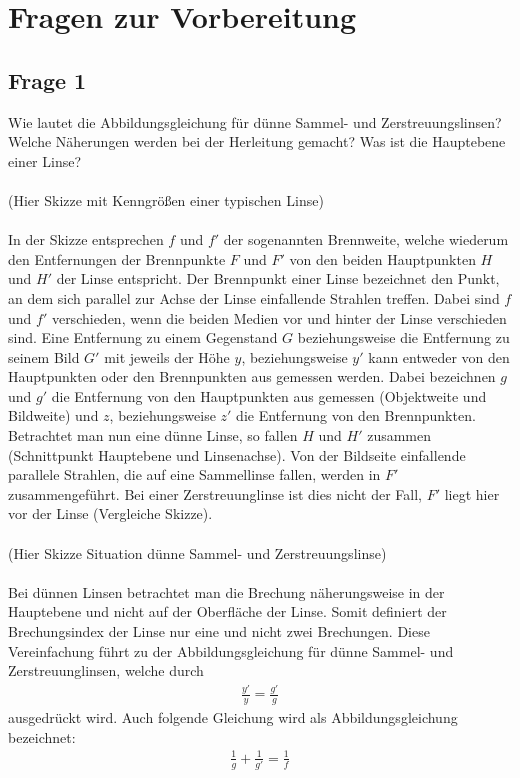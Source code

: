 \documentclass[a4paper,10pt]{scrartcl}
\begin{document}
		\newpage
		
	\section{Fragen zur Vorbereitung}
		\subsection{Frage 1}
			Wie lautet die Abbildungsgleichung für dünne Sammel- und Zerstreuungslinsen? Welche Näherungen
			werden bei der Herleitung gemacht? Was ist die Hauptebene einer Linse?\\
			\\
			(Hier Skizze mit Kenngrößen einer typischen Linse)\\
			\\
			In der Skizze entsprechen \(f\) und \(f'\) der sogenannten Brennweite, welche wiederum den Entfernungen der Brennpunkte \(F\) und \(F'\) von den beiden Hauptpunkten \(H\) und \(H'\) der Linse entspricht. Der Brennpunkt einer Linse bezeichnet den Punkt, an dem sich parallel zur Achse der Linse einfallende Strahlen treffen. Dabei sind \(f\) und \(f'\) verschieden, wenn die beiden Medien vor und hinter der Linse verschieden sind. Eine Entfernung zu einem Gegenstand \(G\) beziehungsweise die Entfernung zu seinem Bild \(G'\) mit jeweils der Höhe \(y\), beziehungsweise \(y'\) kann entweder von den Hauptpunkten oder den Brennpunkten aus gemessen werden. Dabei bezeichnen \(g\) und \(g'\) die Entfernung von den Hauptpunkten aus gemessen (Objektweite und Bildweite) und \(z\), beziehungsweise \(z'\) die Entfernung von den Brennpunkten. Betrachtet man nun eine dünne Linse, so fallen \(H\) und \(H'\) zusammen (Schnittpunkt Hauptebene und Linsenachse). Von der Bildseite einfallende parallele Strahlen, die auf eine Sammellinse fallen, werden in \(F'\) zusammengeführt. Bei einer Zerstreuunglinse ist dies nicht der Fall, \(F'\) liegt hier vor der Linse (Vergleiche Skizze).\\
			\\
			(Hier Skizze Situation dünne Sammel- und Zerstreuungslinse)\\
			\\
			Bei dünnen Linsen betrachtet man die Brechung näherungsweise in der Hauptebene und nicht auf der Oberfläche der Linse. Somit definiert der Brechungsindex der Linse nur eine und nicht zwei Brechungen. Diese Vereinfachung führt zu der Abbildungsgleichung für dünne Sammel- und Zerstreuunglinsen, welche durch
			\begin{align*}
			\frac{y'}{y}=\frac{g'}{g}
			\end{align*}
			ausgedrückt wird. Auch folgende Gleichung wird als Abbildungsgleichung bezeichnet:
			\begin{align*}
			\frac{1}{g}+\frac{1}{g'}=\frac{1}{f}
			\end{align*}
			
\end{document}
